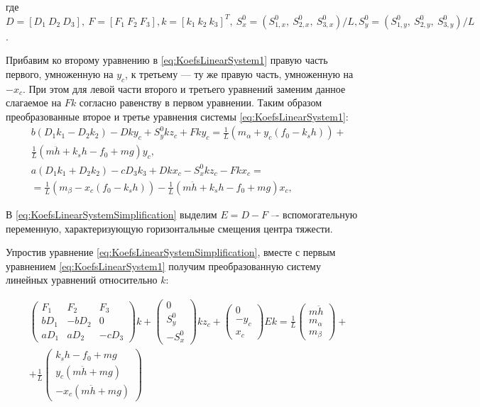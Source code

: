 где $D=\left[D_1~D_2~D_3\right],~F=\left[F_1~F_2~F_3\right], k=\left[k_1~k_2~k_3\right]^T,~S^0_x=\left(S^0_{1,x},~S^0_{2,x},~S^0_{3,x}\right)/L, S^0_y=\left(S^0_{1,y},~S^0_{2,y},~S^0_{3,y}\right)/L$.

Прибавим ко второму уравнению в \ref{eq:KoefsLinearSystem1} правую часть первого, умноженную на $y_c$, к третьему –-- ту же правую часть, умноженную на $-x_c$. При этом для левой части второго и третьего уравнений заменим данное слагаемое на $Fk$ согласно равенству в первом уравнении. Таким образом преобразованные второе и третье уравнения системы \ref{eq:KoefsLinearSystem1}:
\begin{equation}
\label{eq:KoefsLinearSystemSimplification}
\begin{aligned}
& b\left(D_1k_1-D_2k_2\right)-Dky_c + S_y^0kz_c + Fky_c = \frac{1}{L}\left(m_{\alpha} + y_c\left(f_0 - k_sh\right)\right) + \\ & \frac{1}{L}\left(m\ddot{h}+k_sh-f_0+mg\right)y_c, \\
& a\left(D_1k_1+D_2k_2\right)-cD_3k_3+Dkx_c-S_x^0kz_c - Fkx_c = \\ & = \frac{1}{L}\left(m_{\beta} - x_c\left(f_0 - k_sh\right)\right) - \frac{1}{L}\left(m\ddot{h}+k_sh-f_0+mg\right)x_c,
\end{aligned}
\end{equation}

В \ref{eq:KoefsLinearSystemSimplification} выделим $E=D-F$ –- вспомогательную переменную, характеризующую горизонтальные смещения центра тяжести.

Упростив уравнение \ref{eq:KoefsLinearSystemSimplification}, вместе с первым уравнением  \ref{eq:KoefsLinearSystem1} получим преобразованную систему линейных уравнений относительно $k$:

\begin{equation}
\label{eq:KoefsLinearSystem2}
\begin{aligned}
& \begin{pmatrix}
F_1 & F_2 & F_3 \\
bD_1 & -bD_2 & 0 \\
aD_1 & aD_2 & -cD_3
\end{pmatrix}k +
\begin{pmatrix}0 \\ S_y^0 \\ -S_x^0\end{pmatrix}kz_c +
\begin{pmatrix}0 \\ -y_c \\ x_c \end{pmatrix}Ek = \frac{1}{L}
\begin{pmatrix}
m\ddot{h} \\
m_{\alpha} \\
m_{\beta}
\end{pmatrix} + \\
& + \frac{1}{L}\begin{pmatrix}
k_sh - f_0 + mg \\
y_c(m\ddot{h} + mg) \\
-x_c(m\ddot{h} + mg)
\end{pmatrix}
\end{aligned}
\end{equation}

